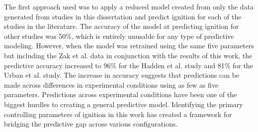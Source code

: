     The first approach used was to apply a reduced model created from only the data generated from studies in this dissertation and predict ignition for each of the studies in the literature. The accuracy of the model at predicting ignition for other studies was 50\%, which is entirely unusable for any type of predictive modeling. However, when the model was retrained using the same five parameters but including the Zak et al. data in conjunction with the results of this work, the predictive accuracy increased to 96\% for the Hadden et al. study and 81\% for the Urban et al. study. The increase in accuracy suggests that predictions can be made across differences in experimental conditions using as few as five parameters. Predictions across experimental conditions have been one of the biggest hurdles to creating a general predictive model. Identifying the primary controlling parameters of ignition in this work has created a framework for bridging the predictive gap across various configurations.  
    
